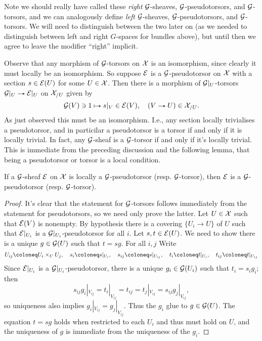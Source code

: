 \begin{remark}
  Note we should really have called these \emph{right} $\mathcal{G}$-sheaves,
  $\mathcal{G}$-pseudotorsors, and $\mathcal{G}$-torsors, and we can analogously define
  \emph{left} $\mathcal{G}$-sheaves, $\mathcal{G}$-pseudotorsors, and $\mathcal{G}$-torsors. We
  will need to distinguish between the two later on (as we needed to
  distinguish between left and right $G$-spaces for bundles above),
  but until then we agree to leave the modifier ``right'' implicit.
\end{remark}

\begin{remarks}
  \label{torsor-equiv}
  Observe that any morphism of $\mathcal{G}$-torsors on $\mathcal{X}$ is an isomorphism,
  since clearly it must locally be an isomorphism. So suppose $\mathcal{E}$ is
  a $\mathcal{G}$-pseudotorsor on $\mathcal{X}$ with a section $s \in \mathcal{E}(U)$ for some $U
  \in \mathcal{X}$. Then there is a morphism of $\mathcal{G}|_U$-torsors $\G|_U \to
  \E|_U$ on $\mathcal{X}_{/U}$ given by
  \[
  \G(V) \ni 1 \mapsto s|_V \in \E(V), \quad (V \to U) \in
  \X_{/U}.
  \]
  As just observed this must be an isomorphism. I.e., any section
  locally trivialises a pseudotorsor, and in particilar a pseudotorsor
  is a torsor if and only if it is locally trivial. In fact, any
  $\mathcal{G}$-sheaf is a $\mathcal{G}$-torsor if and only if it's locally
  trivial. This is immediate from the preceding discussion and the
  following lemma, that being a pseudotorsor or torsor is a local
  condition.
\end{remarks}

\begin{lemma}
  \label{torsor-local}
  If a $\mathcal{G}$-sheaf $\mathcal{E}$ on $\mathcal{X}$ is locally a $\mathcal{G}$-pseudotorsor
  (resp. $\mathcal{G}$-torsor), then $\mathcal{E}$ is a $\mathcal{G}$-pseudotorsor
  (resp. $\mathcal{G}$-torsor).
\end{lemma}

\begin{proof}
  It's clear that the statement for $\mathcal{G}$-torsors follows immediately
  from the statement for pseudotorsors, so we need only prove the
  latter. Let $U \in \mathcal{X}$ such that $\mathcal{E}(V)$ is nonempty. By hypothesis
  there is a covering $\{U_i \to U\}$ of $U$ such that $\mathcal{E}|_{U_i}$ is
  a $\mathcal{G}|_{U_i}$-pseudotorsor for all $i$. Let $s, t \in \mathcal{E}(U)$. We
  need to show there is a unique $g \in \mathcal{G}(U)$ such that $t =
  sg$. For all $i,j$ Write
  \[
  U_{ij} \ce U_i \times_U U_j, \quad
  s_i \ce s|_{U_i}, \quad s_{ij} \ce s|_{U_{ij}}, \quad
  t_i \ce t|_{U_i}, \quad t_{ij} \ce t|_{U_{ij}}
  \]
  Since $\mathcal{E}|_{U_i}$ is a $\mathcal{G}|_{U_i}$-pseudotorsor, there is a unique
  $g_i \in \mathcal{G}(U_i)$ such that $t_i = s_ig_i$; then
  \[
  s_{ij}g_i|_{V_{ij}} = t_i|_{V_{ij}} = t_{ij} = t_j|_{V_{ij}} =
  s_{ij}g_j|_{V_{ij}},
  \]
  so uniqueness also implies $g_i|_{V_{ij}} = g_j|_{V_{ij}}$. Thus the
  $g_i$ glue to $g \in \mathcal{G}(U)$. The equation $t = sg$ holds when
  restricted to each $U_i$ and thus must hold on $U$, and the
  uniqueness of $g$ is immediate from the uniqueness of the $g_i$.
\end{proof}

